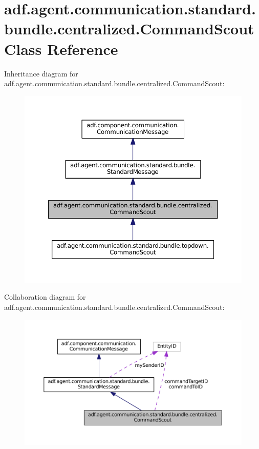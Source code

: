 \hypertarget{classadf_1_1agent_1_1communication_1_1standard_1_1bundle_1_1centralized_1_1CommandScout}{}\section{adf.\+agent.\+communication.\+standard.\+bundle.\+centralized.\+Command\+Scout Class Reference}
\label{classadf_1_1agent_1_1communication_1_1standard_1_1bundle_1_1centralized_1_1CommandScout}


Inheritance diagram for adf.\+agent.\+communication.\+standard.\+bundle.\+centralized.\+Command\+Scout\+:
\nopagebreak
\begin{figure}[H]
\begin{center}
\leavevmode
\includegraphics[width=350pt]{classadf_1_1agent_1_1communication_1_1standard_1_1bundle_1_1centralized_1_1CommandScout__inherit__graph}
\end{center}
\end{figure}


Collaboration diagram for adf.\+agent.\+communication.\+standard.\+bundle.\+centralized.\+Command\+Scout\+:
\nopagebreak
\begin{figure}[H]
\begin{center}
\leavevmode
\includegraphics[width=350pt]{classadf_1_1agent_1_1communication_1_1standard_1_1bundle_1_1centralized_1_1CommandScout__coll__graph}
\end{center}
\end{figure}

